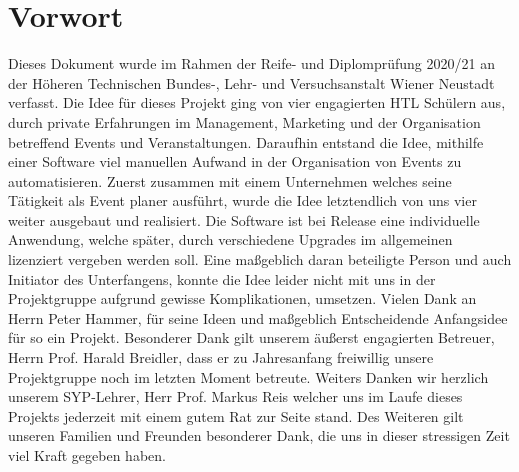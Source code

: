 \chapter{Vorwort}
Dieses Dokument wurde im Rahmen der Reife- und Diplomprüfung 2020/21 an der Höheren Technischen Bundes-, Lehr- und Versuchsanstalt Wiener Neustadt verfasst. Die Idee für dieses Projekt ging von vier engagierten HTL Schülern aus, durch
private Erfahrungen im Management, Marketing und der Organisation betreffend Events und Veranstaltungen. Daraufhin entstand die Idee, mithilfe einer Software viel manuellen Aufwand in der Organisation von Events zu automatisieren. Zuerst zusammen mit einem Unternehmen
welches seine Tätigkeit als Event planer ausführt, wurde die Idee letztendlich von uns vier weiter ausgebaut und realisiert.
Die Software ist bei Release eine individuelle Anwendung, welche später, durch verschiedene Upgrades im allgemeinen lizenziert vergeben werden soll.\newline
Eine maßgeblich daran beteiligte Person und auch Initiator des Unterfangens, konnte die Idee leider nicht mit uns in der Projektgruppe aufgrund gewisse Komplikationen, umsetzen.\newline
Vielen Dank an Herrn Peter Hammer, für seine Ideen und maßgeblich Entscheidende Anfangsidee für so ein Projekt.
Besonderer Dank gilt unserem äußerst engagierten Betreuer, Herrn Prof. Harald Breidler, dass er zu Jahresanfang freiwillig unsere Projektgruppe noch im letzten Moment betreute. Weiters Danken wir herzlich unserem SYP-Lehrer, Herr Prof. Markus Reis
welcher uns im Laufe dieses Projekts jederzeit mit einem gutem Rat zur Seite stand. 
Des Weiteren gilt unseren Familien und Freunden besonderer Dank, die uns in dieser stressigen Zeit viel Kraft gegeben haben.